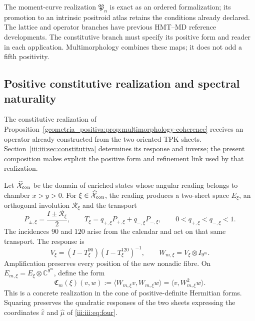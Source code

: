 The moment-curve realization \(\mathfrak P_n\) is exact as an ordered formalization; its promotion to an intrinsic positroid atlas retains the conditions already declared. The lattice and operator branches have previous HMT--MD reference developments. The constitutive branch must specify its positive form and reader in each application. Multimorphology combines these maps; it does not add a fifth positivity.

\subsection{Positive constitutive realization and spectral naturality}
\label{empalme:positividad-constitutiva}

The constitutive realization of Proposition~\ref{geometria_positiva:prop:multimorphology-coherence} receives an operator already constructed from the two oriented TPK sheets. Section~\ref{iii:iii:sec:constitutiva} determines its response and inverse; the present composition makes explicit the positive form and refinement link used by that realization.

Let $\widehat{\mathcal X}_{\rm con}$ be the domain of enriched states whose angular reading belongs to chamber $x>y>0$. For $\xi\in\widehat{\mathcal X}_{\rm con}$, the reading produces a two-sheet space $E_\xi$, an orthogonal involution $\mathcal R_\xi$ and the transport
\[
 P_{\pm,\xi}=\frac{I\pm\mathcal R_\xi}{2},\qquad
 T_\xi=q_{+,\xi}P_{+,\xi}+q_{-,\xi}P_{-,\xi},
 \qquad 0<q_{+,\xi}<q_{-,\xi}<1.
\]
The incidences $90$ and $120$ arise from the calendar and act on that same transport. The response is
\[
 V_\xi=(I-T_\xi^{90})(I-T_\xi^{120})^{-1},\qquad
 W_{m,\xi}=V_\xi\otimes I_{9^m}.
\]
Amplification preserves every position of the new nonadic fibre. On $E_{m,\xi}=E_\xi\otimes\mathbb C^{9^m}$, define the form
\begin{equation}
 \mathfrak C_m(\xi)(v,w)
 :=\langle W_{m,\xi}v,W_{m,\xi}w\rangle
 =\langle v,W_{m,\xi}^{2}w\rangle.
 \label{empalme:eq:forma-constitutiva}
\end{equation}
This is a concrete realization in the cone of positive-definite Hermitian forms. Squaring preserves the quadratic responses of the two sheets expressing the coordinates $\widehat\varepsilon$ and $\widehat\mu$ of \eqref{iii:iii:eq:four}.

